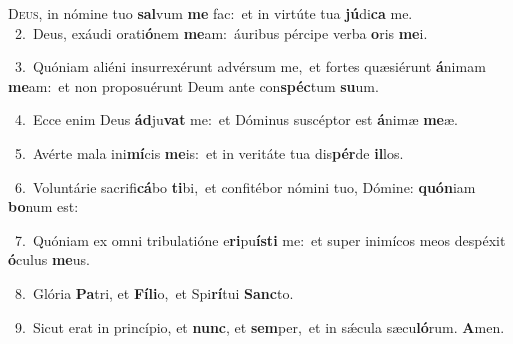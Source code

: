 \lettrine{\initial\textcolor{\initialcolor}{D}}{eus,} in nómine tuo \textbf{sal}\-vum \textbf{me} fac:~\star et in virtúte tua \textbf{jú}\-di\textbf{ca} me.\\
{\numbfont\textcolor{\numbcolor}{~2.}}~Deus, exáudi orati\-\textbf{ó}\-nem \textbf{me}\-am:~\star áuribus pércipe verba \textbf{o}\-ris \textbf{me}\-i.\par
{\numbfont\textcolor{\numbcolor}{~3.}}~Quóniam aliéni insurrexérunt advérsum me,~\dagger et fortes quæsiérunt \textbf{á}\-nimam \textbf{me}\-am:~\star et non proposuérunt Deum ante con\-\textbf{spéc}\-tum \textbf{su}\-um.\par
{\numbfont\textcolor{\numbcolor}{~4.}}~Ecce enim Deus \textbf{ád}\-ju\textbf{vat} me:~\star et Dóminus suscéptor est \textbf{á}\-nimæ \textbf{me}\-æ.\par
{\numbfont\textcolor{\numbcolor}{~5.}}~Avérte mala ini\-\textbf{mí}\-cis \textbf{me}\-is:~\star et in veritáte tua dis\-\textbf{pér}\-de \textbf{il}\-los.\par
{\numbfont\textcolor{\numbcolor}{~6.}}~Voluntárie sacrifi\-\textbf{cá}\-bo \textbf{ti}\-bi,~\star et confitébor nómini tuo, Dómine: \textbf{quón}\-iam \textbf{bo}\-num est:\par
{\numbfont\textcolor{\numbcolor}{~7.}}~Quóniam ex omni tribulatióne e\-\textbf{ri}\-pu\-\textbf{ís}\-\textbf{ti} me:~\star et super inimícos meos despéxit \textbf{ó}\-culus \textbf{me}\-us.\par
{\numbfont\textcolor{\numbcolor}{~8.}}~Glória \textbf{Pa}\-tri, et \textbf{Fí}\-\textbf{li}o,~\star et Spi\-\textbf{rí}\-tui \textbf{Sanc}\-to.\par
{\numbfont\textcolor{\numbcolor}{~9.}}~Sicut erat in princípio, et \textbf{nunc}\-, et \textbf{sem}\-per,~\star et in sǽcula sæcu\-\textbf{ló}\-rum. \textbf{A}\-men.\par
